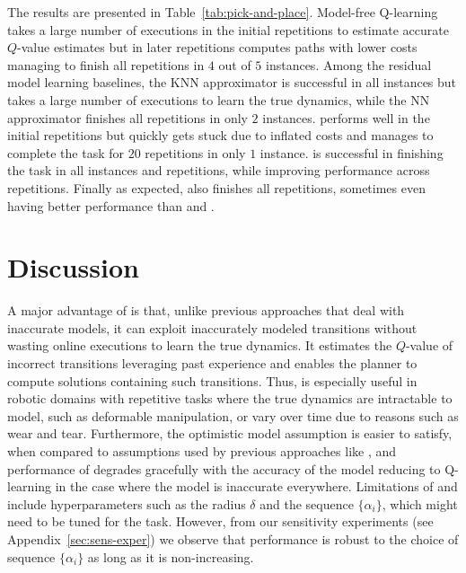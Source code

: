 The results are presented in Table~\ref{tab:pick-and-place}. 
Model-free Q-learning takes a large number of executions in the
initial repetitions to estimate accurate $Q$-value estimates but in
later repetitions computes paths with lower costs managing to finish all
repetitions in $4$ out of $5$ instances. Among the residual model
learning baselines, the KNN approximator is successful in all
instances but takes a large number of executions to learn the true
dynamics, while the NN approximator finishes all repetitions in only
$2$ instances. \cmax{} performs well in the initial repetitions but
quickly gets stuck due to inflated costs and manages to complete the
task for $20$ repetitions in only $1$ instance. \cmaxpp{} is successful in
finishing the 
task in all instances and repetitions, while improving performance
across repetitions. Finally as expected, \acmaxpp{} also finishes all
repetitions, sometimes even having better performance than \cmax{} and
\cmaxpp{}.



\section{Discussion}
\label{sec:disc-concl}

A major advantage of \cmaxpp{} is that, unlike previous approaches
that deal with inaccurate models, it can exploit inaccurately modeled
transitions without wasting online executions to learn the true
dynamics. It estimates the $Q$-value of incorrect transitions
leveraging past experience and enables the planner to compute solutions
containing such transitions. Thus, \cmaxpp{} is especially useful in
robotic domains with repetitive tasks where the true dynamics are
intractable to model, such as deformable manipulation, or vary
over time due to reasons such as wear and tear. Furthermore, the optimistic model assumption is
easier to satisfy, when compared to assumptions used by previous
approaches like \cmax{}, and performance of \cmaxpp{} degrades
gracefully with the accuracy of the model reducing to Q-learning in
the case where the model is inaccurate everywhere.
Limitations of
\cmaxpp{} and \acmaxpp{} include hyperparameters such as the
radius $\delta$ and the sequence $\{\alpha_i\}$, which might need to
be tuned for the task.
However, from our sensitivity experiments (see Appendix~\ref{sec:sens-exper}) we observe
that \acmaxpp{} performance is robust to the choice of sequence
$\{\alpha_i\}$ as long as it is non-increasing.

